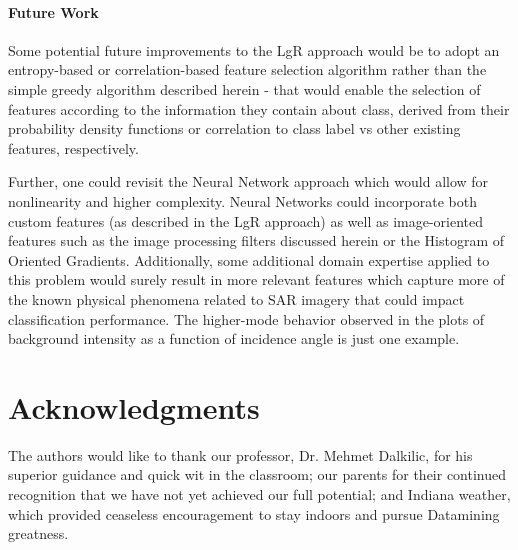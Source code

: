 \documentclass[fleqn,10pt]{SelfArx} %
\begin{document}
\paragraph{Future Work}
Some potential future improvements to the LgR approach would be to adopt an entropy-based or correlation-based feature selection algorithm rather than the simple greedy algorithm described herein - that would enable the selection of features according to the information they contain about class, derived from their probability density functions or correlation to class label vs other existing features, respectively.  

Further, one could revisit the Neural Network approach which would allow for nonlinearity and higher complexity.  Neural Networks could incorporate both custom features (as described in the LgR approach) as well as image-oriented features such as the image processing filters discussed herein or the Histogram of Oriented Gradients.  Additionally, some additional domain expertise applied to this problem would surely result in more relevant features which capture more of the known physical phenomena related to SAR imagery that could impact classification performance.  The higher-mode behavior observed in the plots of background intensity as a function of incidence angle is just one example.




\section*{Acknowledgments} %
The authors would like to thank our professor, Dr. Mehmet Dalkilic, for his superior guidance and quick wit in the classroom; our parents for their continued recognition that we have not yet achieved our full potential; and Indiana weather, which provided ceaseless encouragement to stay indoors and pursue Datamining greatness.






\end{document}
